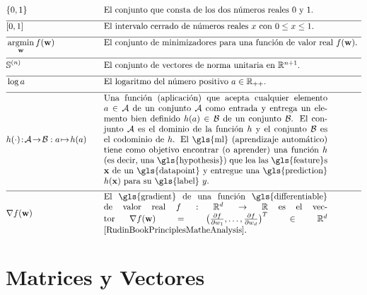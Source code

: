 \newpage
\begin{align}
	&\{0,1\}& \quad & \mbox{El conjunto que consta de los dos números reales $0$ y $1$.} \nonumber \\[2mm] \hline \nonumber\\[-5mm]
&[0,1] &\quad &\mbox{El intervalo cerrado de números reales $x$ con $0 \leq x \leq 1$. }\nonumber \\[2mm] \hline \nonumber\\[-5mm]
&\argmin_{\weights} f(\weights) &\quad &\mbox{El conjunto de minimizadores para una función de valor real $f(\weights)$.  } \nonumber \\[2mm] \hline \nonumber\\[-5mm]
&\sphere{\nrnodes} &\quad &\mbox{El conjunto de vectores de norma unitaria en $\mathbb{R}^{\nrnodes+1}$.  }\nonumber \\[2mm] \hline \nonumber\\[-5mm]
 &\log a &\quad &\mbox{El logaritmo del número positivo $a \in \mathbb{R}_{++}$.  } \nonumber \\[2mm] \hline \nonumber\\[-5mm]
 &\hypothesis(\cdot)\!:\!\mathcal{A}\!\rightarrow\!\mathcal{B} :  a \!\mapsto\!h(a) &\quad &\parbox{.75\textwidth}{
	 Una función (aplicación) que acepta cualquier elemento $a \in \mathcal{A}$ de un conjunto $\mathcal{A}$ 
	 como entrada y entrega un elemento bien definido $h(a) \in \mathcal{B}$ de un conjunto $\mathcal{B}$. 
	 El conjunto $\mathcal{A}$ es el dominio de la función $h$ y el conjunto $\mathcal{B}$ es el 
	 codominio de $\hypothesis$. El \gls{ml} (aprendizaje automático) tiene como objetivo encontrar (o aprender) 
	 una función $\hypothesis$ (es decir, una \gls{hypothesis}) que lea las \gls{feature}s $\featurevec$ de un \gls{datapoint} 
	 y entregue una \gls{prediction} $\hypothesis(\featurevec)$ para su \gls{label} $\truelabel$.} \nonumber \\[2mm] \hline \nonumber\\[-5mm]
	 &\nabla f(\weights) & \quad & \parbox{.75\textwidth}{El \gls{gradient} de una función \gls{differentiable} de valor real 
	 $f: \mathbb{R}^{\featuredim}\rightarrow \mathbb{R}$ es el vector 
	 $\nabla f(\weights) = \big( \frac{\partial f}{\partial \weight_{1}},\ldots,\frac{\partial f}{\partial \weight_{\featuredim}}  \big)^{T} \in \mathbb{R}^{\featuredim}$ \cite[Ch. 9]{RudinBookPrinciplesMatheAnalysis}.}   \nonumber
\end{align} 

\section*{Matrices y Vectores} 

